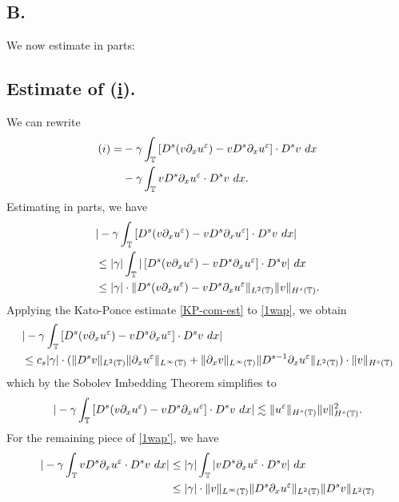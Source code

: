 \subsection{B.} We now estimate in parts:
%
%
%
%
%
\subsection{Estimate of (\hyperref[8u]{i}).} 
We can rewrite
\begin{equation}
\begin{split}
(i)
= & -\gamma \int_{\mathbb{T}} \left[ D^s(v \partial_x u^\varepsilon) - v D^s
\partial_x u^\varepsilon \right] \cdot D^s v \ dx
\\
& -  \gamma \int_{\mathbb{T}} v D^s \partial_x u^\varepsilon \cdot D^s v \ dx.
\label{1wap'}
\end{split}
\end{equation}
Estimating in parts, we have
\begin{equation}
\begin{split}
& |-\gamma \int_{\mathbb{T}} \left[ D^s(v \partial_x u^\varepsilon) - v D^s
\partial_x u^\varepsilon \right] \cdot D^s v \ dx |
\\
& \le |\gamma| \int_{\mathbb{T}} |\left[ D^s(v \partial_x u^\varepsilon ) - v D^s
\partial_x u^\varepsilon \right] \cdot D^s v| \ dx
\\
& \le |\gamma| \cdot \|D^s (v \partial_x u^\varepsilon) - v D^s \partial_x u^\varepsilon
\|_{L^2(\mathbb{T})} \|v\|_{H^s(\mathbb{T})}.
\label{1wap}
\end{split}
\end{equation}
Applying the Kato-Ponce estimate \eqref{KP-com-est} to \eqref{1wap}, we
obtain
\begin{equation*}
\begin{split}
& | -\gamma \int_{\mathbb{T}} \left[ D^s(v \partial_x u^\varepsilon) - v D^s
\partial_x u^\varepsilon \right] \cdot D^s v \ dx |
\\
& \le c_s |\gamma| \cdot ( \|D^s v \|_{L^2(\mathbb{T})} \|\partial_x
u^\varepsilon\|_{L^\infty(\mathbb{T})} + \|\partial_x v \|_{L^\infty(\mathbb{T})} \|D^{s-1}
\partial_x u^\varepsilon \|_{L^2(\mathbb{T})}) \cdot \|v\|_{H^s(\mathbb{T})}
\end{split}
\end{equation*}
which by the Sobolev Imbedding Theorem simplifies to
\begin{equation}
\begin{split}
| -\gamma \int_{\mathbb{T}} \left[ D^s(v \partial_x u^\varepsilon ) - v D^s
\partial_x u^\varepsilon \right] \cdot D^s v \ dx |
\lesssim \|u^\varepsilon \|_{H^s(\mathbb{T})} \|v\|_{H^s(\mathbb{T})}^2.
\label{2wap}
\end{split}
\end{equation}
For the remaining piece of \eqref{1wap'}, we have
\begin{equation*}
\begin{split}
| - \gamma \int_{\mathbb{T}} v D^s \partial_x u^\varepsilon \cdot D^s v \ dx |
& \le |\gamma| \int_{\mathbb{T}} |v D^s \partial_x u^\varepsilon \cdot D^s v | \ dx
\\
& \le |\gamma| \cdot \|v\|_{L^\infty(\mathbb{T})} \|D^s \partial_x u^\varepsilon
\|_{L^2(\mathbb{T})} \|D^s v\|_{L^2(\mathbb{T})}
\end{split}
\end{equation*}
